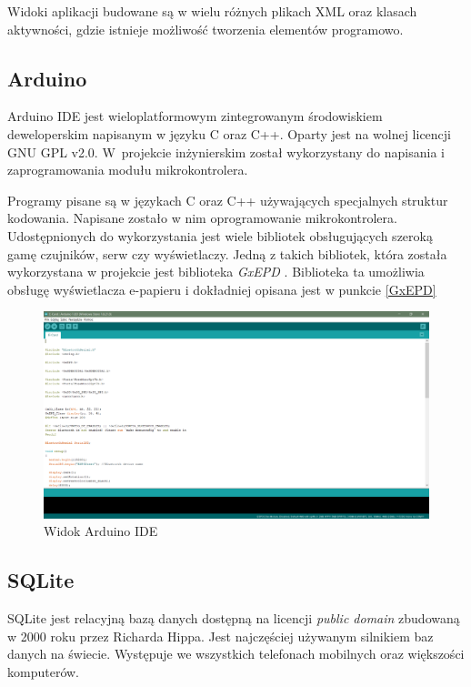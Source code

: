 \documentclass[a4paper,12pt, twoside]{article}
\begin{document}
    	Widoki aplikacji budowane są w wielu różnych plikach XML oraz klasach aktywności, gdzie istnieje możliwość tworzenia elementów programowo.
    	
    	\subsection{Arduino}
    	Arduino IDE jest wieloplatformowym zintegrowanym środowiskiem deweloperskim napisanym w języku C oraz C++. Oparty jest na wolnej licencji GNU GPL v2.0. W~projekcie inżynierskim został wykorzystany do napisania i zaprogramowania modułu mikrokontrolera.
    	
    	Programy pisane są w językach C oraz C++ używających specjalnych struktur kodowania. Napisane zostało w nim oprogramowanie mikrokontrolera. Udostępnionych do wykorzystania jest wiele bibliotek obsługujących szeroką gamę czujników, serw czy wyświetlaczy. Jedną z takich bibliotek, która została wykorzystana w projekcie jest biblioteka \textit{GxEPD} \cite{gxepd}. Biblioteka ta umożliwia obsługę wyświetlacza e-papieru i dokładniej opisana jest w punkcie \ref{GxEPD}
    	
    	\begin{figure}[H]
    			\includegraphics[width=1\textwidth]{images/rys3_arduino.png}
    			\caption{Widok Arduino IDE}
                \label{fig:arduinoide}
    	\end{figure}
    	
    	\subsection{SQLite}
    	SQLite jest relacyjną bazą danych dostępną na licencji \textit{public domain}\cite{publicdomain} zbudowaną w 2000 roku przez Richarda Hippa. Jest najczęściej używanym silnikiem baz danych na świecie. Występuje we wszystkich telefonach mobilnych oraz większości komputerów. 
    	
\end{document}
